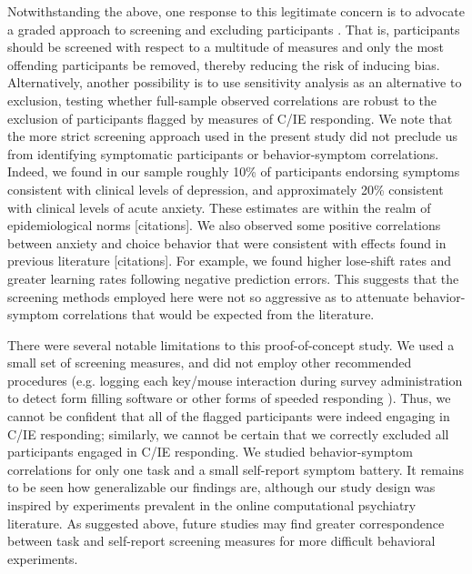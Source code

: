 \documentclass[a4paper,notitlepage,12pt]{article}
\begin{document}
Notwithstanding the above, one response to this legitimate concern is to advocate a graded approach to screening and excluding participants \cite{Kim2018-ev}. That is, participants should be screened with respect to a multitude of measures and only the most offending participants be removed, thereby reducing the risk of inducing bias. Alternatively, another possibility is to use sensitivity analysis as an alternative to exclusion, testing whether full-sample observed correlations are robust to the exclusion of participants flagged by measures of C/IE responding. We note that the more strict screening approach used in the present study did not preclude us from identifying symptomatic participants or behavior-symptom correlations. Indeed, we found in our sample roughly 10\% of participants endorsing symptoms consistent with clinical levels of depression, and approximately 20\% consistent with clinical levels of acute anxiety. These estimates are within the realm of epidemiological norms [citations]. We also observed some positive correlations between anxiety and choice behavior that were consistent with effects found in previous literature [citations]. For example, we found higher lose-shift rates and greater learning rates following negative prediction errors. This suggests that the screening methods employed here were not so aggressive as to attenuate behavior-symptom correlations that would be expected from the literature. 

There were several notable limitations to this proof-of-concept study. We used a small set of screening measures, and did not employ other recommended procedures (e.g. logging each key/mouse interaction during survey administration to detect form filling software or other forms of speeded responding \cite{buchanan2018methods}). Thus, we cannot be confident that all of the flagged participants were indeed engaging in C/IE responding; similarly, we cannot be certain that we correctly excluded all participants engaged in C/IE responding. We studied behavior-symptom correlations for only one task and a small self-report symptom battery. It remains to be seen how generalizable our findings are, although our study design was inspired by experiments prevalent in the online computational psychiatry literature. As suggested above, future studies may find greater correspondence between task and self-report screening measures for more difficult behavioral experiments. 
\end{document}
